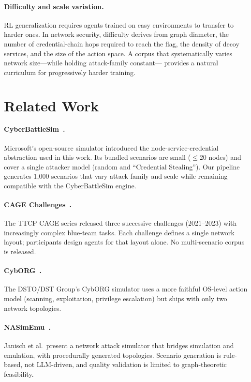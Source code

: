 \documentclass[11pt,a4paper]{article}
\newcommand{\CBS}{CyberBattleSim\xspace}
\newcommand{\CAGE}{CAGE\xspace}
\newcommand{\CybORG}{CybORG\xspace}
\newcommand{\NSE}{NASimEmu\xspace}
\begin{document}
\paragraph{Difficulty and scale variation.}
RL generalization requires agents trained on easy environments to transfer to
harder ones.  In network security, difficulty derives from graph diameter,
the number of credential-chain hops required to reach the flag, the density
of decoy services, and the size of the action space.  A corpus that
systematically varies network size—while holding attack-family constant—
provides a natural curriculum for progressively harder training.

\section{Related Work}
\label{sec:related}

\paragraph{\CBS~\cite{cyberbattlesim2021}.}
Microsoft's open-source simulator introduced the node-service-credential
abstraction used in this work.  Its bundled scenarios are small ($\leq 20$
nodes) and cover a single attacker model (random and ``Credential
Stealing'').  Our pipeline generates 1,000 scenarios that vary attack family
and scale while remaining compatible with the \CBS engine.

\paragraph{\CAGE Challenges~\cite{cage2021}.}
The TTCP \CAGE series released three successive challenges (2021--2023) with
increasingly complex blue-team tasks.  Each challenge defines a single
network layout; participants design agents for that layout alone.  No
multi-scenario corpus is released.

\paragraph{\CybORG~\cite{cyborg2020}.}
The DSTO/DST Group's \CybORG simulator uses a more faithful OS-level action
model (scanning, exploitation, privilege escalation) but ships with only two
network topologies.

\paragraph{\NSE~\cite{nasimu2023}.}
Janisch et al.\ present a network attack simulator that bridges simulation
and emulation, with procedurally generated topologies.  Scenario generation
is rule-based, not LLM-driven, and quality validation is limited to
graph-theoretic feasibility.
\end{document}
